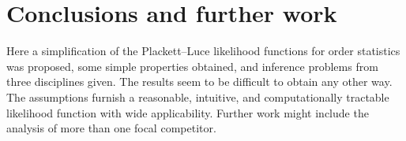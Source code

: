 \documentclass[article]{ajs}
\begin{document}
\section{Conclusions and further work}

Here a simplification of the Plackett--Luce likelihood functions for
order statistics was proposed, some simple properties obtained, and
inference problems from three disciplines given.  The results seem to
be difficult to obtain any other way.  The assumptions furnish a
reasonable, intuitive, and computationally tractable likelihood
function with wide applicability.  Further work might include the
analysis of more than one focal competitor.




%

\end{document}
